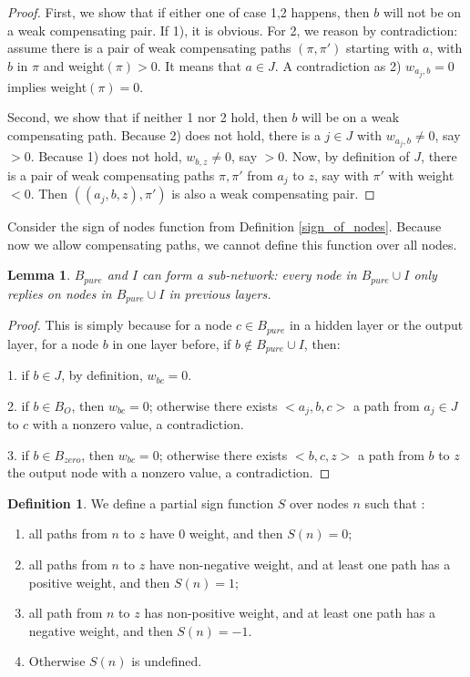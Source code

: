 \documentclass[]{article}
\newtheorem{lemma}{Lemma}
\theoremstyle{definition}
\newtheorem{definition}{Definition}
\begin{document}
\begin{proof}
	First, we show that if either one of case 1,2 happens, then $b$ will not be on a weak compensating pair. If 1), it is obvious. For 2, we reason by contradiction: assume there is a pair of weak compensating paths 	$(\pi,\pi')$ starting with $a$, with $b$ in $\pi$ and weight$(\pi) > 0$. It means that $a \in J$. A contradiction as 2) $w_{a_j,b}=0$ implies weight$(\pi)=0$.
	
	Second, we show that if neither 1 nor 2 hold, then $b$ will be on a weak compensating path.
	Because 2) does not hold, there is a $j \in J$ with $w_{a_j,b} \neq 0$, say $>0$.
	Because 1) does not hold, $w_{b,z} \neq 0$, say $>0$.
	Now, by definition of $J$, there is a pair of weak compensating paths $\pi,\pi'$ 
	from $a_j$ to $z$, say with $\pi'$ with weight $<0$.
	Then $((a_j,b,z), \pi')$ is also a weak compensating pair.
\end{proof}


Consider the sign of nodes function from Definition \ref{sign_of_nodes}. Because now we allow compensating paths, we cannot define this function over all nodes.

\begin{lemma}\label{lem:subnetwrok}
	$B_{pure}$ and $I$ can form a sub-network: every node in $B_{pure}\cup I$ only replies on nodes in $B_{pure}\cup I$ in previous layers.
\end{lemma}

\begin{proof}
	This is simply because for a node $c\in B_{pure}$ in a hidden layer or the output layer, for a node $b$ in one layer before, if $b\notin B_{pure}\cup I$, then:
	
	1. if $b\in J$, by definition, $w_{bc}=0$.
	
	2. if $b\in B_{O}$, then $w_{bc}=0$; otherwise there exists $<a_j,b,c>$ a path from $a_j\in J$ to $c$ with a nonzero value, a contradiction.
	
	3. if $b\in B_{zero}$, then $w_{bc}=0$; otherwise there exists $<b,c,z>$ a path from $b$ to $z$ the output node with a nonzero value, a contradiction.
	
\end{proof}


\begin{definition}\label{sign_of_nodes_in_I_2}
	We define a partial sign function $S$ over nodes $n$ such that : 	
	\begin{enumerate} 
		\item all paths from $n$ to $z$ have 0 weight, and then $S(n)=0$; 
		\item all paths from $n$ to $z$ have non-negative weight, and at least one path has a positive weight, and then $S(n)=1$; 
		\item all path from $n$ to $z$ has non-positive weight, and at least one path has a negative weight, and then $S(n)=-1$.
		\item Otherwise $S(n)$ is undefined.
	\end{enumerate}
\end{definition}	
\end{document}
